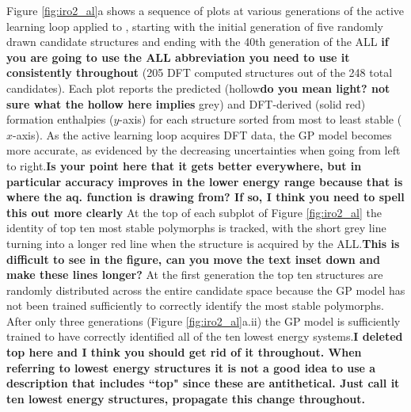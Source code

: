 %
Figure \ref{fig:iro2_al}a shows a sequence of plots at various generations of the active learning loop applied to \IrOthree,
starting with the initial generation of five randomly drawn candidate structures and ending with the 40th generation of the ALL \textbf{if you are going to use the ALL abbreviation you need to use it consistently throughout}
(\num{205} DFT computed structures out of the \num{248} total candidates).
%
Each plot reports the predicted (hollow\textbf{do you mean light? not sure what the hollow here implies} grey) and DFT-derived (solid red) formation enthalpies ($y$-axis) for each structure sorted from most to least stable ($x$-axis).
%
As the active learning loop acquires DFT data, the GP model becomes more accurate, as evidenced by the decreasing uncertainties when going from left to right.\textbf{Is your point here that it gets better everywhere, but in particular accuracy improves in the lower energy range because that is where the aq. function is drawing from?  If so, I think you need to spell this out more clearly}
%
At the top of each subplot of Figure \ref{fig:iro2_al} the identity of top ten most stable polymorphs is tracked,
with the short grey line turning into a longer red line when the structure is acquired by the ALL.\textbf{This is difficult to see in the figure, can you move the text inset down and make these lines longer?}
%
At the first generation the top ten structures are randomly distributed across the entire candidate space because the GP model has not been trained sufficiently to correctly identify the most stable polymorphs.
%
After only three generations (Figure \ref{fig:iro2_al}a.ii) the GP model is sufficiently trained to have correctly identified all of the ten lowest energy systems.\textbf{I deleted top here and I think you should get rid of it throughout.  When referring to lowest energy structures it is not a good idea to use a description that includes ``top" since these are antithetical.  Just call it ten lowest energy structures, propagate this change throughout.}

